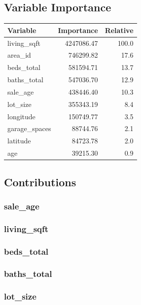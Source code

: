 \documentclass[
]{article}
\begin{document}
\subsection{Variable Importance}\label{variable-importance}

{\def\LTcaptype{} %
\begin{longtable}[]{@{}lrr@{}}
\toprule\noalign{}
Variable & Importance & Relative \\
\midrule\noalign{}
\endhead
\bottomrule\noalign{}
\endlastfoot
living\_sqft & 4247086.47 & 100.0 \\
area\_id & 746299.82 & 17.6 \\
beds\_total & 581594.71 & 13.7 \\
baths\_total & 547036.70 & 12.9 \\
sale\_age & 438446.40 & 10.3 \\
lot\_size & 355343.19 & 8.4 \\
longitude & 150749.77 & 3.5 \\
garage\_spaces & 88744.76 & 2.1 \\
latitude & 84723.78 & 2.0 \\
age & 39215.30 & 0.9 \\
\end{longtable}
}

\subsection{Contributions}\label{contributions}

\subsubsection{sale\_age}\label{sale_age}

\subsubsection{living\_sqft}\label{living_sqft}

\subsubsection{beds\_total}\label{beds_total}

\subsubsection{baths\_total}\label{baths_total}

\subsubsection{lot\_size}\label{lot_size}
\end{document}

